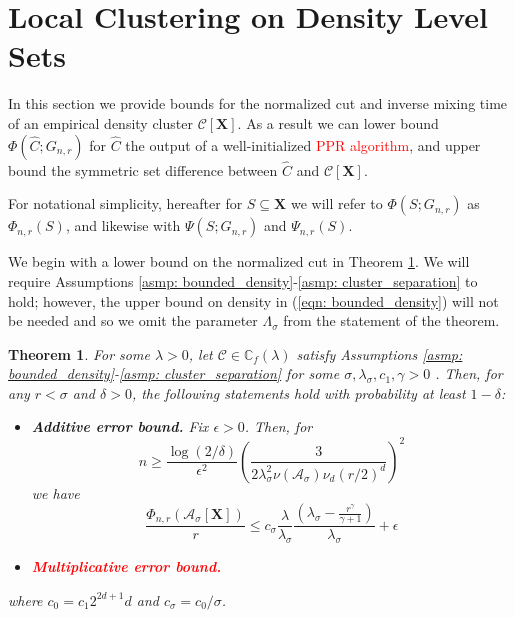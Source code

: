 \documentclass{article}
\newcommand{\1}{\mathbf{1}}
\newcommand{\Xbf}{\mathbf{X}}
\newcommand{\Cset}{\mathcal{C}}
\newcommand{\Aset}{\mathcal{A}}
\newcommand{\Asig}{\Aset_{\sigma}}
\theoremstyle{aldenthm}
\newtheorem{theorem}{Theorem}
\theoremstyle{remark}
\begin{document}
\section{Local Clustering on Density Level Sets}
\label{sec: local_clustering_on_density_level_set}

In this section we provide bounds for the normalized cut and inverse mixing time of an empirical density cluster $\Cset[\Xbf]$. As a result we can lower bound $\Phi(\widehat{C}; G_{n,r})$ for $\widehat{C}$ the output of a well-initialized \textcolor{red}{PPR algorithm}, and upper bound the symmetric set difference between $\widehat{C}$ and $\Cset[\Xbf]$. 

For notational simplicity, hereafter for $S \subseteq \Xbf$ we will refer to $\Phi(S; G_{n,r})$ as $\Phi_{n,r}(S)$, and likewise with $\Psi(S; G_{n,r})$ and $\Psi_{n,r}(S)$.

We begin with a lower bound on the normalized cut in Theorem \ref{thm: conductance_upper_bound}. We will require Assumptions \ref{asmp: bounded_density}-\ref{asmp: cluster_separation} to hold; however, the upper bound on density in (\ref{eqn: bounded_density}) will not be needed and so we omit the parameter $\Lambda_{\sigma}$ from the statement of the theorem.
\begin{theorem}
	\label{thm: conductance_upper_bound}
	For some $\lambda > 0$, let $\Cset \in \mathbb{C}_f(\lambda)$ satisfy Assumptions \ref{asmp: bounded_density}-\ref{asmp: cluster_separation} for some $\sigma, \lambda_{\sigma}, c_1, \gamma > 0$ . Then, for any $r < \sigma$ and $\delta > 0$, the following statements hold with probability at least $1 - \delta$: 
	\begin{itemize}
		\item 
		\textbf{Additive error bound.} Fix $\epsilon > 0$. Then, for
		\begin{equation}
		\label{eqn: conductance_sample_complexity}
		n \geq \frac{\log(2/\delta)}{\epsilon^2}\left(\frac{3}{2 \lambda_{\sigma}^2 \nu(\Asig) \nu_d (r/2)^d}\right)^2 
		\end{equation}
		we have
		\begin{equation}
		\label{eqn: conductance_additive_error_bound}
		\frac{\Phi_{n,r}(\Asig[\mathbf{X}])}{r} \leq c_{\sigma} \frac{\lambda}{\lambda_{\sigma}} \frac{(\lambda_{\sigma} - \frac{r^{\gamma}}{\gamma+1})}{\lambda_{\sigma}} + \epsilon
		\end{equation}
		\item
		\textcolor{red}{\textbf{Multiplicative error bound.}}
	\end{itemize}
	where $c_0 = c_1 2^{2d+1}d$ and $c_{\sigma} = c_0 / \sigma$. 
\end{theorem}
\end{document}
